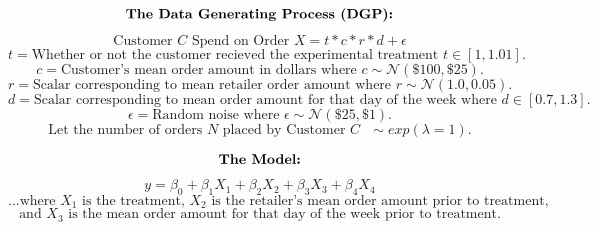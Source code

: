 \documentclass[12pt]{article}
\begin{document}
\[\text{\bf{The Data Generating Process (DGP):}}\]
\[\text{Customer $C$ Spend on Order $X$} = t*c*r*d + \epsilon \]
\[t = \text{Whether or not the customer recieved the experimental treatment } t \in [1,1.01].\]
\[c = \text{Customer's mean order amount in dollars where } c \sim \mathcal{N}(\$100,\$25).\]
\[r = \text{Scalar corresponding to mean retailer order amount where } r \sim \mathcal{N}(1.0,0.05).\]
\[d = \text{Scalar corresponding to mean order amount for that day of the week where } d \in [0.7,1.3].\]
\[\epsilon = \text{Random noise where } \epsilon \sim \mathcal{N}(\$25,\$1).\]
\[\text{Let the number of orders $N$ placed by Customer $C$ } \sim exp(\lambda = 1).\]

\[\text{\bf{The Model:}}\]
\[ y = \beta_0 + \beta_1X_1 + \beta_2X_2 + \beta_3X_3 + \beta_4X_4 \]
\[\text{...where $X_1$ is the treatment, $X_2$ is the retailer's mean order amount prior to treatment,}\] 
\[\text{and $X_3$ is the mean order amount for that day of the week prior to treatment.}\]
\end{document}
